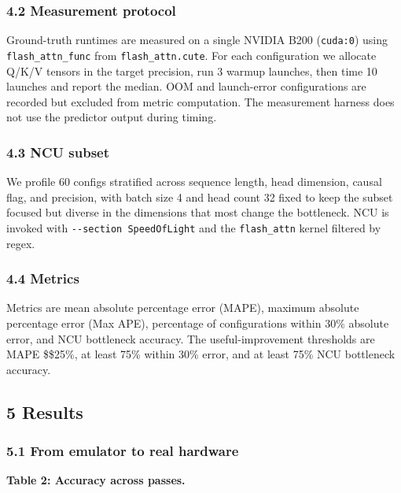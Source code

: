 \subsubsection{4.2 Measurement protocol}\label{measurement-protocol}

Ground-truth runtimes are measured on a single NVIDIA B200
(\texttt{cuda:0}) using \texttt{flash\_attn\_func} from
\texttt{flash\_attn.cute}. For each configuration we allocate Q/K/V
tensors in the target precision, run 3 warmup launches, then time 10
launches and report the median. OOM and launch-error configurations are
recorded but excluded from metric computation. The measurement harness
does not use the predictor output during timing.

\subsubsection{4.3 NCU subset}\label{ncu-subset}

We profile 60 configs stratified across sequence length, head dimension,
causal flag, and precision, with batch size 4 and head count 32 fixed to
keep the subset focused but diverse in the dimensions that most change
the bottleneck. NCU is invoked with \texttt{-\/-section\ SpeedOfLight}
and the \texttt{flash\_attn} kernel filtered by regex.

\subsubsection{4.4 Metrics}\label{metrics}

Metrics are mean absolute percentage error (MAPE), maximum absolute
percentage error (Max APE), percentage of configurations within 30\%
absolute error, and NCU bottleneck accuracy. The useful-improvement
thresholds are MAPE \$\le\$25\%, at least 75\% within 30\% error, and at
least 75\% NCU bottleneck accuracy.

\subsection{5 Results}\label{results}

\subsubsection{5.1 From emulator to real
hardware}\label{from-emulator-to-real-hardware}

\textbf{Table 2: Accuracy across passes.}

